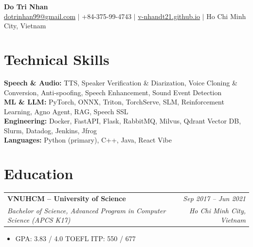 \documentclass[10pt,a4paper]{article}
\makeatletter
\newcommand{\cventry}[4]{%
  \noindent
  \begin{tabular*}{\linewidth}{@{}l@{\extracolsep{\fill}}r@{}}
    {\color{accent}\textbf{#1}} & \textit{\small #2} \\
    \textit{\small #3} & \textit{\small #4}
  \end{tabular*}%
  \vspace{1pt}%
}
\makeatother
\begin{document}
\begin{center}
  {\LARGE\bfseries\color{headcolor} Do Tri Nhan}\\[5pt]
  \small\color{subtlegray}
  \faEnvelope\;\href{mailto:dotrinhan99@gmail.com}{dotrinhan99@gmail.com}
  \;\;$\vert$\;\;
  \faPhone*\;+84-375-99-4743
  \;\;$\vert$\;\;
  \faGlobe\;\href{https://v-nhandt21.github.io/}{v-nhandt21.github.io}
  \;\;$\vert$\;\;
  \faMapMarker*\;Ho Chi Minh City, Vietnam
\end{center}

\vspace{1pt}

\section{Technical Skills}

{\color{accent}\textbf{Speech \& Audio:}} TTS, Speaker Verification \& Diarization, Voice Cloning \& Conversion, Anti-spoofing, Speech Enhancement, Sound Event Detection \\[3.5pt]
{\color{accent}\textbf{ML \& LLM:}} PyTorch, ONNX, Triton, TorchServe, SLM, Reinforcement Learning, Agno Agent, RAG, Speech SSL \\[3.5pt]
{\color{accent}\textbf{Engineering:}} Docker, FastAPI, Flask, RabbitMQ, Milvus, Qdrant Vector DB, Slurm, Datadog, Jenkins, Jfrog \\[3.5pt]
{\color{accent}\textbf{Languages:}} Python (primary), C++, Java, React Vibe

\section{Education}

\cventry{VNUHCM -- University of Science}{Sep 2017 -- Jun 2021}
        {Bachelor of Science, Advanced Program in Computer Science (APCS K17)}{Ho Chi Minh City, Vietnam}

\vspace{1pt}
\begin{itemize}
  \item GPA: 3.83 / 4.0 \quad TOEFL ITP: 550 / 677
\end{itemize}
\end{document}
